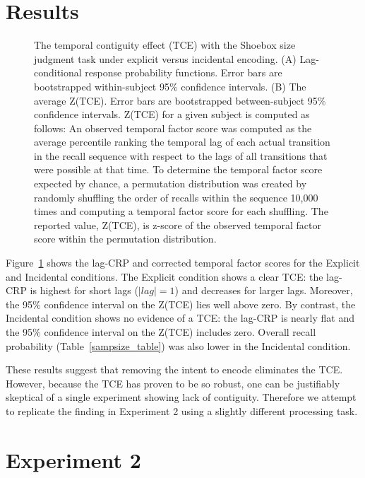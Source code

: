 \documentclass[jou,natbib]{apa6} %
\begin{document}
\section{Results}

\newcommand\paneltext{(A) Lag-conditional response probability functions. Error bars are bootstrapped within-subject 95\% confidence intervals. (B) The average Z(TCE).  Error bars are bootstrapped between-subject 95\% confidence intervals. Z(TCE) for a given subject is computed as follows: An observed temporal factor score was computed as the average percentile ranking the temporal lag of each actual transition in the recall sequence with respect to the lags of all transitions that were possible at that time. To determine the temporal factor score expected by chance, a permutation distribution was created by randomly shuffling the order of recalls within the sequence 10,000 times and computing a temporal factor score for each shuffling. The reported value, Z(TCE), is z-score of the observed temporal factor score within the permutation distribution.}
\begin{figure*}
\caption{The temporal contiguity effect (TCE) with the Shoebox size judgment task under explicit versus incidental encoding. \paneltext}
\label{shoebox}
\end{figure*}



Figure~\ref{shoebox} shows the lag-CRP and corrected temporal factor scores for the Explicit and Incidental conditions. The Explicit condition shows a clear TCE: the lag-CRP is highest for short lags ($|lag|=1$) and decreases for larger lags. Moreover, the 95\% confidence interval on the Z(TCE) lies well above zero. By contrast, the Incidental condition shows no evidence of a TCE: the lag-CRP is nearly flat and the 95\% confidence interval on the Z(TCE) includes zero. Overall recall probability (Table~\ref{sampsize_table}) was also lower in the Incidental condition.

These results suggest that removing the intent to encode eliminates the TCE. However, because the TCE has proven to be so robust, one can be justifiably skeptical of a single experiment showing lack of contiguity. Therefore we attempt to replicate the finding in Experiment 2 using a slightly different processing task.

\section{Experiment 2}
\end{document}
